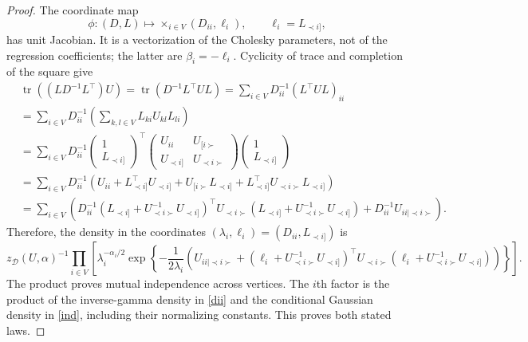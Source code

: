 \documentclass[12pt]{article}
\DeclareMathOperator{\tr}{tr}
\newcommand{\D}{\mathcal{D}}
\theoremstyle{plain}
\theoremstyle{definition}
\theoremstyle{remark}
\begin{document}
\begin{proof}
The coordinate map
\begin{equation}\label{oto}
\phi:(D,L)\longmapsto
\mathop{\times}_{i\in V}(D_{ii},\ell_i),
\qquad \ell_i=L_{\prec i]},
\end{equation}
has unit Jacobian.  It is a vectorization of the Cholesky parameters,
not of the regression coefficients; the latter are
\(\beta_i=-\ell_i\).  Cyclicity of trace and completion of the square
give
\begin{align*}
&\tr((LD^{-1}L^{\top})U)= \tr(D^{-1}L^{\top}UL) =\sum_{i\in V}D^{-1}_{ii}(L^{\top}UL)_{ii}\\
&=\sum_{i\in V}D^{-1}_{ii}(\sum_{k,l\in V}L_{ki}U_{kl}L_{li})\\
&=\sum_{i\in V}D^{-1}_{ii}\left(\begin{matrix}1\\ L_{\prec i]}\end{matrix}\right)^{\top}\left(\begin{matrix}U_{ii}& U_{[i\succ}\\U_{\prec i]}& U_{\prec i\succ} \end{matrix}\right)\left(\begin{matrix}1\\L_{\prec i]}  \end{matrix}\right)\\
&=\sum_{i\in V}D^{-1}_{ii}(U_{ii}+ L_{\prec i]}^{\top}U_{\prec i]}+U_{[i\succ}L_{\prec i]}+L^{\top}_{\prec i]}U_{\prec i\succ}L_{\prec i]})\\
&=\sum_{i\in V}\left(D^{-1}_{ii}(L_{\prec i]}+U^{-1}_{\prec i\succ}U_{\prec i]})^{\top} U_{\prec i\succ} (L_{\prec i]}+U^{-1}_{\prec i \succ}U_{\prec i]}) +  D^{-1}_{ii}U_{ii|\prec i\succ}\right).
\end{align*}
Therefore, the density in the coordinates
\((\lambda_i,\ell_i)=(D_{ii},L_{\prec i]})\) is
\begin{equation}\label{D-parameterp}
z_{\D}(U,\alpha)^{-1}
\prod_{i\in V}
\left[
\lambda_i^{-\alpha_i/2}
\exp\left\{-\frac{1}{2\lambda_i}
\left(
U_{ii\mid\prec i\succ}
+(\ell_i+U_{\prec i\succ}^{-1}U_{\prec i]})^\top
U_{\prec i\succ}
(\ell_i+U_{\prec i\succ}^{-1}U_{\prec i]})
\right)\right\}
\right].
\end{equation}
The product proves mutual independence across vertices.  The \(i\)th
factor is the product of the inverse-gamma density in \eqref{dii} and
the conditional Gaussian density in \eqref{ind}, including their
normalizing constants.  This proves both stated laws.
\end{proof}
\end{document}
